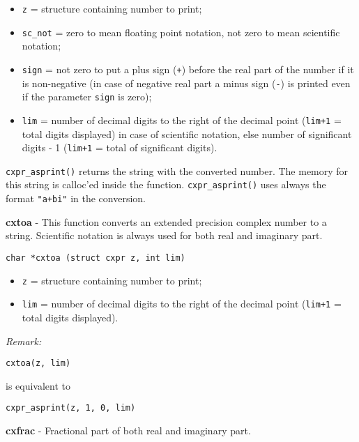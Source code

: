 \documentclass{article}
\begin{document}
\begin{itemize}
\item \texttt{z} = structure containing number to print;
\item \texttt{sc\_not} = zero to mean floating point notation, not zero to mean scientific notation;
\item \texttt{sign}   = not zero to put a plus sign (\texttt{+}) before the real part 
of the number if it is non-negative (in case of negative real part 
a minus sign (\texttt{-}) is printed even if the parameter \texttt{sign} is zero);
\item \texttt{lim}    = number of decimal digits to the right of the
decimal point (\texttt{lim+1} = total digits displayed) in
case of scientific notation, else number of significant digits - 1
(\texttt{lim+1} = total of significant digits).
\end{itemize}

\texttt{cxpr\_asprint()} returns the string with the converted number.
The memory for this string is calloc'ed inside the function.
\texttt{cxpr\_asprint()} uses always the format \texttt{"a+bi"} in
the conversion. 


\hrulefill{}

\textbf{cxtoa} - This function converts an extended precision complex
number to a string.
Scientific notation is always used for both real and imaginary part.

\begin{verbatim}
char *cxtoa (struct cxpr z, int lim)
\end{verbatim}

\begin{itemize}
\item \texttt{z}   = structure containing number to print;
\item \texttt{lim} = number of decimal digits to the right of the
decimal point (\texttt{lim+1} = total digits displayed).
\end{itemize}

\textit{Remark:}

\begin{verbatim}
cxtoa(z, lim)
\end{verbatim}
is equivalent to  

\begin{verbatim}
cxpr_asprint(z, 1, 0, lim)
\end{verbatim}

\hrulefill{}

\textbf{cxfrac} - Fractional part of both real and imaginary part.
\end{document}
